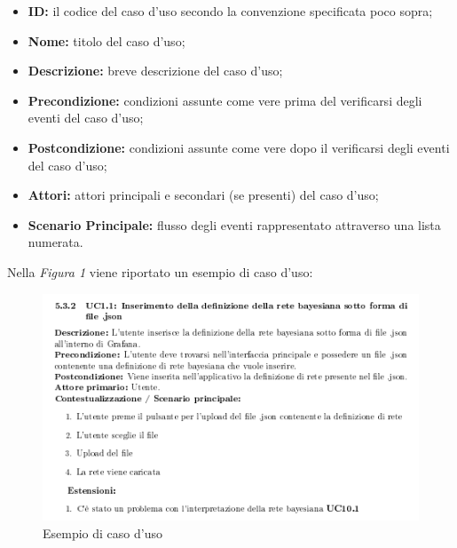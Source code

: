 	    \begin{itemize}
	    	\item \textbf{ID:} il codice del caso d'uso secondo la convenzione specificata poco sopra;
	    	\item \textbf{Nome:} titolo del caso d'uso;
	    	\item \textbf{Descrizione:} breve descrizione del caso d'uso;
	    	\item \textbf{Precondizione:} condizioni assunte come vere prima del verificarsi degli eventi del caso d'uso;
	    	\item \textbf{Postcondizione:} condizioni assunte come vere dopo il verificarsi degli eventi del caso d'uso;
	    	\item \textbf{Attori:} attori principali e secondari (se presenti) del caso d'uso;
	    	\item \textbf{Scenario Principale:} flusso degli eventi rappresentato attraverso una lista numerata.\newline
	    \end{itemize}
	    Nella \textit{Figura 1} viene riportato un esempio di caso d'uso:\newline \newline
    
	    \begin{figure}[!htbp]
	    	\centering
	    	\includegraphics{casoduso.png}
	    	\caption{Esempio di caso d'uso}
	    \end{figure}
    
